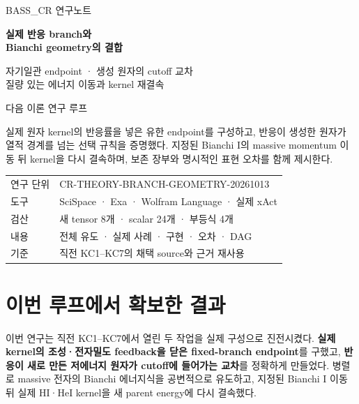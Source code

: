 \documentclass[11pt,a4paper]{article}
\begin{document}
\begin{titlepage}
{\color{MidnightBlue}\large BASS\_CR 연구노트\par}
\vspace{15mm}
{\Huge\bfseries 실제 반응 branch와\\[3mm]Bianchi geometry의 결합\par}
\vspace{8mm}
{\Large 자기일관 endpoint · 생성 원자의 cutoff 교차\\[2mm]질량 있는 에너지 이동과 kernel 재결속\par}
\vspace{12mm}
{\large 다음 이론 연구 루프\par}
\vspace{4mm}{2026년 10월 13일 (KST)\par}
\vspace{12mm}
\begin{minipage}{.96\textwidth}\large
실제 원자 kernel의 반응률을 넣은 유한 endpoint를 구성하고,
반응이 생성한 원자가 열적 경계를 넘는 선택 규칙을 증명했다.
지정된 Bianchi I의 massive momentum 이동 뒤 kernel을 다시
결속하며, 보존 장부와 명시적인 표현 오차를 함께 제시한다.
\end{minipage}
\vfill
\begin{tabular}{@{}ll@{}}
연구 단위 & CR-THEORY-BRANCH-GEOMETRY-20261013\\
도구 & SciSpace · Exa · Wolfram Language · 실제 xAct\\
검산 & 새 tensor 8개 · scalar 24개 · 부등식 4개\\
내용 & 전체 유도 · 실제 사례 · 구현 · 오차 · DAG\\
기준 & 직전 KC1–KC7의 채택 source와 근거 재사용\\
\end{tabular}
\end{titlepage}
\tableofcontents\clearpage
\hypertarget{uxc774uxbc88-uxb8e8uxd504uxc5d0uxc11c-uxd655uxbcf4uxd55c-uxacb0uxacfc}{%
\section{이번 루프에서 확보한 결과}\label{uxc774uxbc88-uxb8e8uxd504uxc5d0uxc11c-uxd655uxbcf4uxd55c-uxacb0uxacfc}}

이번 연구는 직전 KC1--KC7에서 열린 두 작업을 실제 구성으로 진전시켰다. \textbf{실제 kernel의 조성·전자밀도 feedback을 닫은 fixed-branch endpoint}를 구했고, \textbf{반응이 새로 만든 저에너지 원자가 cutoff에 들어가는 교차}를 정확하게 만들었다. 병렬로 massive 전자의 Bianchi 에너지식을 공변적으로 유도하고, 지정된 Bianchi I 이동 뒤 실제 HI·HeI kernel을 새 parent energy에 다시 결속했다.
\end{document}
